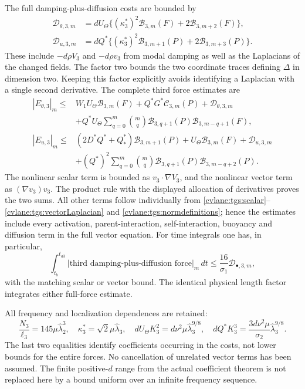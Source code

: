 The full damping-plus-diffusion costs are bounded by
\begin{align}
 \mathcal D_{\theta,3,m}
 &=dU_\Theta\{(\kappa_3^*)^2\mathcal B_{3,m}(F)
                              +2\mathcal B_{3,m+2}(F)\},\nonumber\\
 \mathcal D_{u,3,m}
 &=dQ^*\{(\kappa_3^*)^2\mathcal B_{3,m+1}(P)
                              +2\mathcal B_{3,m+3}(P)\}.
 \label{cvlane:tgs:diffusioncosts}
\end{align}
These include $-d\rho V_3$ and $-d\rho v_3$ from modal
damping as well as the Laplacians of the changed fields.
The factor two bounds the two coordinate traces defining
$\Delta$ in dimension two. Keeping this factor explicitly avoids
identifying a Laplacian with a single second derivative.
The complete third force estimates are
\begin{align}
 |E_{\theta,3}|_m\leq{}&W_1U_\Theta\mathcal B_{3,m}(F)
           +Q^*G^*\mathcal C_{3,m}(P)+\mathcal D_{\theta,3,m}
 \nonumber\\
 &+Q^*U_\Theta\sum_{q=0}^m\binom mq
       \mathcal B_{3,q+1}(P)\mathcal B_{3,m-q+1}(F),
 \label{cvlane:tgs:scalarcost}\\
 |E_{u,3}|_m\leq{}&(2D^*Q^*+Q_*^*)\mathcal B_{3,m+1}(P)
           +U_\Theta\mathcal B_{3,m}(F)+\mathcal D_{u,3,m}
 \nonumber\\
 &+(Q^*)^2\sum_{q=0}^m\binom mq
       \mathcal B_{3,q+1}(P)\mathcal B_{3,m-q+2}(P).
 \label{cvlane:tgs:vectorcost}
\end{align}
The nonlinear scalar term is bounded as $v_3\cdot\nabla V_3$,
and the nonlinear vector term as $(\nabla v_3)v_3$.
The product rule with the displayed allocation of derivatives
proves the two sums. All other terms follow individually from
\eqref{cvlane:tgs:scalar}--\eqref{cvlane:tgs:vectorLaplacian} and
\eqref{cvlane:tgs:normdefinitions}; hence the estimates include every
activation, parent-interaction, self-interaction, buoyancy and
diffusion term in the full vector equation.
For time integrals one has, in particular,
\begin{equation}\label{cvlane:tgs:integratedcost}
 \int_{t_b}^{t_{a3}}|\text{third damping-plus-diffusion force}|_m\,dt
 \leq\frac{16}{\sigma_1}\mathcal D_{\bullet,3,m},
\end{equation}
with the matching scalar or vector bound. The identical physical
length factor integrates either full-force estimate.

All frequency and localization dependences are retained:
\begin{equation}\label{cvlane:tgs:frequencycost}
 \frac{N_3}{\ell_3}=145\mu\widehat\lambda_2^3,
 \quad\kappa_3^*=\sqrt2\mu\widehat\lambda_3,
 \quad dU_\Theta K_3^2=d\nu^2\mu\widehat\lambda_3^{9/8},
 \quad dQ^*K_3^3=\frac{3d\nu^2\mu}{\sigma_2}
                      \widehat\lambda_3^{9/8}.
\end{equation}
The last two equalities identify coefficients occurring in the
costs, not lower bounds for the entire forces. No cancellation of
unrelated vector terms has been assumed. The finite positive-$d$
range from the actual coefficient theorem is not replaced here by
a bound uniform over an infinite frequency sequence.

